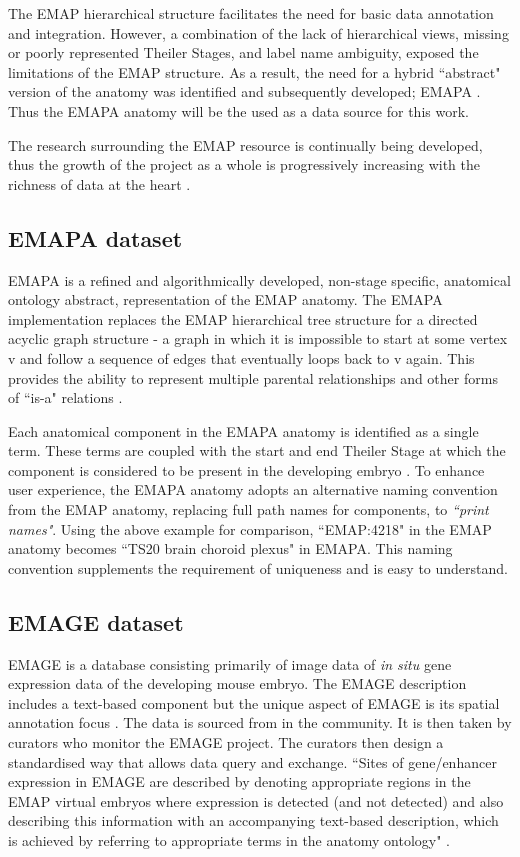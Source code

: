 The EMAP hierarchical structure facilitates the need for basic data annotation and integration. However, a combination of the lack of hierarchical views, missing or poorly represented Theiler Stages, and label name ambiguity, exposed the limitations of the EMAP structure. As a result, the need for a hybrid ``abstract" version of the anatomy was identified and subsequently developed; EMAPA \cite{emap}. Thus the EMAPA anatomy will be the used as a data source for this work.

The research surrounding the EMAP resource is continually being developed, thus the growth of the project as a whole is progressively increasing with the richness of data at the heart \cite{emap}.

\subsection{EMAPA dataset}\label{emapaanatomy}
EMAPA is a refined and algorithmically developed, non-stage specific, anatomical ontology abstract, representation of the EMAP anatomy. The EMAPA implementation replaces the EMAP hierarchical tree structure for a directed acyclic graph structure - a graph in which it is impossible to start at some vertex v and follow a sequence of edges that eventually loops back to v again. This provides the ability to represent multiple parental relationships and other forms of ``is-a" relations \cite{emap}.

Each anatomical component in the EMAPA anatomy is identified as a single term. These terms are coupled with the start and end Theiler Stage at which the component is considered to be present in the developing embryo \cite{emap}. To enhance user experience, the EMAPA anatomy  adopts an alternative naming convention from the EMAP anatomy, replacing full path names for components, to \textit{``print names"}. Using the above example for comparison, ``EMAP:4218" in the EMAP anatomy becomes ``TS20 brain choroid plexus" in EMAPA. This naming convention supplements the requirement of uniqueness and is easy to understand.

\subsection{EMAGE dataset}
EMAGE is a database consisting primarily of image data of \textit{in situ} gene expression data of the developing mouse embryo. The EMAGE description includes a text-based component but the unique aspect of EMAGE is its spatial annotation focus \cite{emap}. The data is sourced from in the community. It is then taken by curators who monitor the EMAGE project. The curators then design a standardised way that allows data query and exchange. ``Sites of gene/enhancer expression in EMAGE are described by denoting appropriate regions in the EMAP virtual embryos where expression is detected (and not detected) and also describing this information with an accompanying text-based description, which is achieved by referring to appropriate terms in the anatomy ontology" \cite{emap}.